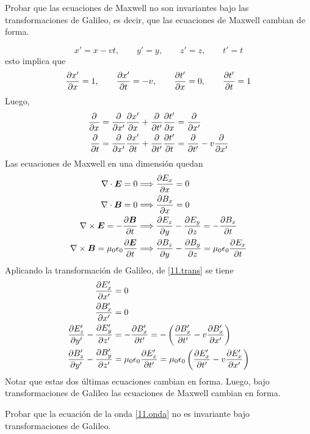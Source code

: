 \begin{ej}
	Probar que las ecuaciones de Maxwell no son invariantes bajo las transformaciones de Galileo, es decir, que las ecuaciones de Maxwell cambian de forma.
\end{ej}
\begin{sol}
	\begin{equation}
  x'=x-vt,\qquad y'=y,\qquad z'=z,\qquad t'=t
\end{equation}
esto implica que
\begin{equation}
  \pdv{x'}{x}=1,\qquad \pdv{x'}{t}=-v,\qquad \pdv{t'}{x}=0,\qquad \pdv{t'}{t}=1
\end{equation}
Luego,
\begin{equation}\label{11.trans}
\begin{split}
  \pdv{x}&=\pdv{x'}\pdv{x'}{x}+\pdv{t'}\pdv{t'}{x}=\pdv{x'}\\
  \pdv{t}&=\pdv{x'}\pdv{x'}{t}+\pdv{t'}\pdv{t'}{t}=\pdv{t'}-v\pdv{x'}
 \end{split}
\end{equation}
Las ecuaciones de Maxwell en una dimensión quedan
\begin{align}
  \nabla\cdot\vb*{E}=0&\Longrightarrow \pdv{E_x}{x}=0\\
  \nabla\cdot\vb*{B}=0&\Longrightarrow \pdv{B_x}{x}=0\\
  \nabla\times \vb*{E}=-\pdv{\vb*{B}}{t}&\Longrightarrow \pdv{E_z}{y}-\pdv{E_y}{z}=-\pdv{B_x}{t}\\
  \nabla\times \vb*{B}=\mu_0\epsilon_0\pdv{\vb*{E}}{t}&\Longrightarrow \pdv{B_z}{y}-\pdv{B_y}{z}=\mu_0\epsilon_0\pdv{E_x}{t}\\
\end{align}
Aplicando la transformación de Galileo, de \eqref{11.trans} se tiene
\begin{align}
  \pdv{E_x'}{x'}&=0\\
  \pdv{B_x'}{x'}&=0\\
  \pdv{E_z'}{y'}-\pdv{E_y'}{z'}&=-\pdv{B_x'}{t'}=-\left(\pdv{B_x'}{t'}-v\pdv{B_x'}{x'}\right)\\
  \pdv{B_z'}{y'}-\pdv{B_y'}{z'}&=\mu_0\epsilon_0\pdv{E_x'}{t'}=\mu_0\epsilon_0\left(\pdv{E_x'}{t'}-v\pdv{E_x'}{x'}\right)
\end{align}
Notar que estas dos últimas ecuaciones cambian en forma. Luego, bajo transformaciones de Galileo las ecuaciones de Maxwell cambian en forma.
\end{sol}

\begin{ej}
	Probar que la ecuación de la onda \eqref{11.onda} no es invariante bajo transformaciones de Galileo.
\end{ej}



